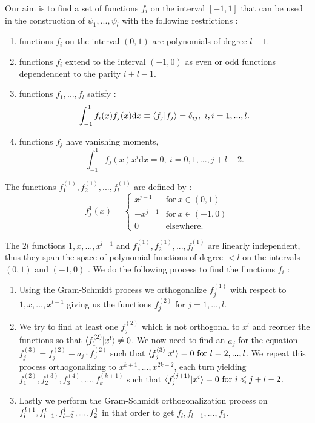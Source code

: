 \documentclass[../master_thesis.tex]{subfiles}
\begin{document}
Our aim is to find a set of functions $f_i$ on the interval $[-1,1]$ that can
be used in the construction of $\psi_1, ...,\psi_l$ with the following restrictions
\cite{Alpert1993, Beylkin:MRA}:
\begin{enumerate}
  \item functions $f_i$ on the interval $(0,1)$ are polynomials of degree $l-1.$
  \item functions $f_i$ extend to the interval $(-1, 0)$ as even or odd functions
  dependendent to the parity $i + l - 1$.
  \item functions $f_1,...,f_l$ satisfy : $$\int_{-1}^1f_i(x)f_j(x)\text{d}x \equiv \braket{f_j| f_j} = \delta_{ij}, \ i, i = 1, ..., l.$$
  \item functions $f_j$ have vanishing moments, $$\int_{-1}^1f_j(x)x^i\text{d}x = 0, \ i = 0, 1, ..., j+l-2.$$
\end{enumerate}
The functions $f^{(1)}_1, f^{(1)}_2, ..., f^{(1)}_l$ are defined by \cite{Alpert1993}:
\begin{equation}
  f^1_j(x) =
  \begin{cases}
  x^{j-1} & \text{for} \ x\in (0,1)\\
  -x^{j-1} & \text{for}\ x\in (-1, 0)\\
  0 & \text{elsewhere}.
\end{cases}
\end{equation}

The $2l$ functions $1, x,..., x^{l-1} $ and $ f^{(1)}_1, f^{(1)}_2, ..., f^{(1)}_l$ are linearly
independent, thus they span the space of polynomial functions of
degree $< l$ on the intervals $(0, 1)$ and $(-1, 0)$ \cite{Alpert1993, Beylkin:MRA}. We do the
following process to find the functions $f_i$ \cite{Alpert1993}:
\begin{enumerate}
  \item Using the Gram-Schmidt process we orthogonalize $f^{(1)}_j$ with respect to $1, x,..., x^{l-1}$
  giving us the functions $f_j^{(2)}$ for $j = 1, ..., l$.
  \item  We try to find at least one $f^{(2)}_j$
  which is not orthogonal to $x^{l}$ and reorder the functions so that $\braket{f_1^{(2)}| x^{l}} \neq 0$.
  We now need to find an $a_j$ for the equation $f_j^{(3)} = f_j^{(2)}-a_j\cdot f_0^{(2)}$ such that
  $\braket{f_j^{(3)}| x^{l}} = 0\  \text{for}\  l = 2, ..., l$. We repeat this process orthogonalizing
  to $x^{k+1}, ..., x^{2k-2}$, each turn yielding $f_1^{(2)}, f_2^{(3)}, f_3^{(4)}, ..., f_k^{(k+1)}$ such that
  $\braket{f_j^{(j+1)}|x^i} = 0 \ \text{for}\  i\leqslant j+l-2$.
  \item  Lastly we perform the Gram-Schmidt orthogonalization process on
  $f_{l}^{l+1}, \\f_{l-1}^{l}, f_{l-2}^{l-1}, ..., f_{2}^{1}$ in that order to get
  $ f_l, f_{l-1}, ..., f_1$.
\end{enumerate}
\end{document}

